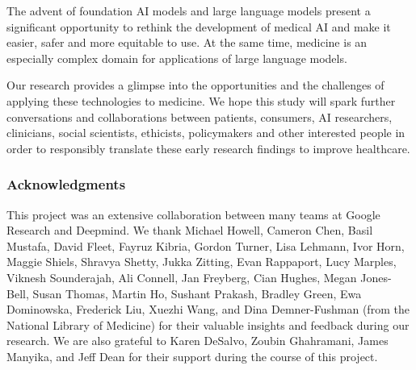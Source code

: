 \documentclass[10pt, letter, onecolumn]{arxiv}
\begin{document}
\begin{refsection}
The advent of foundation AI models and large language models present a significant opportunity to rethink the development of medical AI and make it easier, safer and more equitable to use. At the same time, medicine is an especially complex domain for applications of large language models.

Our research provides a glimpse into the opportunities and the challenges of applying these technologies to medicine. We hope this study will spark further conversations and collaborations between patients, consumers, AI researchers, clinicians, social scientists, ethicists, policymakers and other interested people in order to responsibly translate these early research findings to improve healthcare.

\subsubsection*{Acknowledgments}
This project was an extensive collaboration between many teams at Google Research and Deepmind. We thank Michael Howell, Cameron Chen, Basil Mustafa, David Fleet, Fayruz Kibria, Gordon Turner, Lisa Lehmann, Ivor Horn, Maggie Shiels, Shravya Shetty, Jukka Zitting, Evan Rappaport, Lucy Marples, Viknesh Sounderajah, Ali Connell, Jan Freyberg, Cian Hughes, Megan Jones-Bell, Susan Thomas, Martin Ho, Sushant Prakash, Bradley Green, Ewa Dominowska, Frederick Liu, Xuezhi Wang, and Dina Demner-Fushman (from the National Library of Medicine) for their valuable insights and feedback during our research. We are also grateful to Karen DeSalvo, Zoubin Ghahramani, James Manyika, and Jeff Dean for their support during the course of this project.

\newpage
\setlength\bibitemsep{3pt}
\printbibliography
\balance
\clearpage


\newpage

\end{refsection}
\end{document}
